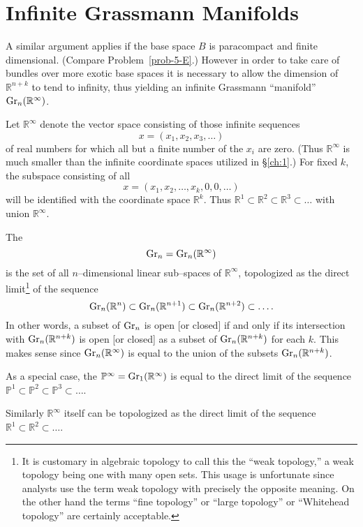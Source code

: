 \documentclass[../main]{subfiles}
\begin{document}
\section{Infinite Grassmann Manifolds}\label{sec:5.1}
A similar argument applies if the base space $B$ is paracompact and finite dimensional. (Compare Problem~\ref{prob-5-E}.) However in order to take care of bundles over more exotic base spaces it is necessary to allow the dimension of ${\mathbb R}^{n + k}$ to tend to infinity, thus yielding an infinite Grassmann ``manifold'' $\operatorname{Gr}_n({\mathbb R}^\infty)$. 

Let ${\mathbb R}^\infty$ denote the vector space consisting of those infinite sequences \[x = (x_1, x_2, x_3, \ldots)\] of real numbers for which all but a finite number of the $x_i$ are zero. (Thus ${\mathbb R}^\infty$ is much smaller than the infinite coordinate spaces utilized in \S\ref{ch:1}.) For fixed $k$, the subspace consisting of all \[x = (x_1, x_2, \ldots, x_k, 0, 0, \ldots)\] will be identified with the coordinate space ${\mathbb R}^k$. Thus ${\mathbb R}^1 \subset {\mathbb R}^2 \subset {\mathbb R}^3 \subset \ldots$ with union ${\mathbb R}^\infty$. 

\begin{definition}
The  \[\operatorname{Gr}_n = \operatorname{Gr}_n({\mathbb R}^\infty)\] is the set of all $n$--dimensional linear sub--spaces of ${\mathbb R}^\infty$, topologized as the direct limit\footnote{It is customary in algebraic topology to call this the ``weak topology,'' a weak topology being one with many open sets. This usage is unfortunate since analysts use the term weak topology with precisely the opposite meaning. On the other hand the terms ``fine topology'' or ``large topology'' or ``Whitehead topology'' are certainly acceptable.} of the sequence \[\operatorname{Gr}_n({\mathbb R}^n) \subset \operatorname{Gr}_n({\mathbb R}^{n + 1}) \subset \operatorname{Gr}_n({\mathbb R}^{n + 2}) \subset \ldots.\] In other words, a subset of $\operatorname{Gr}_n$ is open [or closed] if and only if its intersection with $\operatorname{Gr}_n({\mathbb R}^{n + k})$ is open [or closed] as a subset of $\operatorname{Gr}_n({\mathbb R}^{n + k})$ for each $k$. This makes sense since $\operatorname{Gr}_n({\mathbb R}^\infty)$ is equal to the union of the subsets $\operatorname{Gr}_n({\mathbb R}^{n + k})$. 
\end{definition}

As a special case, the  ${\mathbb P}^\infty = \operatorname{Gr}_1({\mathbb R}^\infty)$ is equal to the direct limit of the sequence ${\mathbb P}^1 \subset {\mathbb P}^2 \subset {\mathbb P}^3 \subset \ldots$.

Similarly ${\mathbb R}^\infty$ itself can be topologized as the direct limit of the sequence ${\mathbb R}^1 \subset {\mathbb R}^2 \subset \ldots$. 
\end{document}
